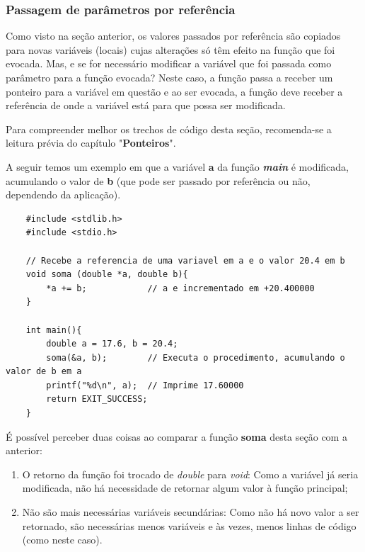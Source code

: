 \documentclass[12pt]{article}
\newcommand\tab[1][1cm]{\hspace*{#1}}
\begin{document}
\subsubsection{Passagem de parâmetros por referência}

\par\tab  Como visto na seção anterior, os valores passados por referência são copiados para novas variáveis (locais) cujas alterações só têm efeito na função que foi evocada. Mas, e se for necessário modificar a variável que foi passada como parâmetro para a função evocada? Neste caso, a função passa a receber um ponteiro para a variável em questão e ao ser evocada, a função deve receber a referência de onde a variável está para que possa ser modificada.

\hspace{0.25cm}
\begin{tcolorbox}[colback=blue!5!white,colframe=blue!75!black,title=Dica!]
  \par\tab Para compreender melhor os trechos de código desta seção, recomenda-se a leitura prévia do capítulo "\textbf{Ponteiros}".
\end{tcolorbox}

\par\tab A seguir temos um exemplo em que a variável \textbf{a} da função \textit{\textbf{main}} é modificada, acumulando o valor de \textbf{b} (que pode ser passado por referência ou não, dependendo da aplicação).

\hspace{0.25cm}
\begin{lstlisting}
    #include <stdlib.h>
    #include <stdio.h>

    // Recebe a referencia de uma variavel em a e o valor 20.4 em b
    void soma (double *a, double b){
        *a += b;            // a e incrementado em +20.400000
    }
    
    int main(){
        double a = 17.6, b = 20.4;
        soma(&a, b);        // Executa o procedimento, acumulando o valor de b em a
        printf("%d\n", a);  // Imprime 17.60000
        return EXIT_SUCCESS;
    }
\end{lstlisting}

\par\tab É possível perceber duas coisas ao comparar a função \textbf{soma} desta seção com a anterior:
\begin{enumerate}
    \item O retorno da função foi trocado de \textit{double} para \textit{void}: Como a variável já seria modificada, não há necessidade de retornar algum valor à função principal;
    \item Não são mais necessárias variáveis secundárias: Como não há novo valor a ser retornado, são necessárias menos variáveis e às vezes, menos linhas de código (como neste caso).
\end{enumerate}
\end{document}

